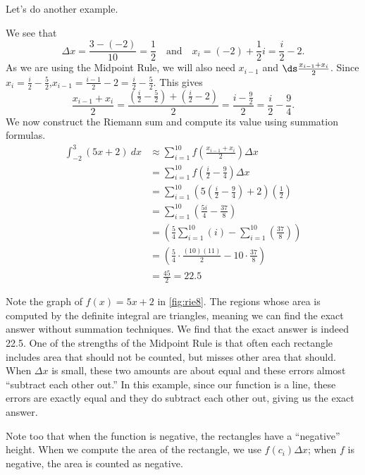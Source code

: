 Let's do another example.

{We see that %
\[
 \Delta x = \frac{3 - (-2)}{10} = \frac12
 \quad \text{and} \quad
 x_i = (-2) + \frac12 i = \frac i2-2.
\]
As we are using the Midpoint Rule, we will also need $x_{i-1}$ and $\ds \frac{x_{i-1}+x_i}2$. Since $x_i = \frac i2-\frac52$,\quad $x_{i-1} = \frac{i-1}2 - 2 = \frac i2 -\frac52$.  This gives 
\[
 \frac{x_{i-1}+x_i}2 = \frac{(\frac i2-\frac52) + (\frac i2-2)}{2} = \frac{i-\frac92}{2} = \frac i2 - \frac94.
\]
We now construct the Riemann sum and compute its value using summation formulas.
\begin{align*}
	\int_{-2}^3 (5x+2)\ dx
	&\approx \sum_{i=1}^{10} f\left(\frac{x_{i-1}+x_i}{2}\right)\Delta x \\
	&= \sum_{i=1}^{10} f\left(\frac i2 - \frac94\right)\Delta x \\
	&= \sum_{i=1}^{10} \left(5\left(\frac i2-\frac94\right) + 2\right)\left(\frac12\right)\\
	&= \sum_{i=1}^{10}\left(\frac{5i}4 - \frac{37}8\right)\\
	&= \left(\frac54\sum_{i=1}^{10} (i) -
	 \sum_{i=1}^{10}\left(\frac{37}8\right)\right) \\
	&= \left(\frac54\cdot\frac{(10)(11)}2 - 10\cdot\frac{37}8\right)  \\
	&= \frac{45}2 = 22.5
\end{align*}


Note the graph of $f(x) = 5x+2$ in \autoref{fig:rie8}. The regions whose area is computed by the definite integral are triangles, meaning we can find the exact answer without summation techniques. We find that the exact answer is indeed 22.5. One of the strengths of the Midpoint Rule is that often each rectangle includes area that should not be counted, but misses other area that should. When $\Delta x$ is small, these two amounts are about equal and these errors almost ``subtract each other out.'' In this example, since our function is a line, these errors are exactly equal and they do subtract each other out, giving us the exact answer.

Note too that when the function is negative, the rectangles have a ``negative'' height. When we compute the area of the rectangle, we use $f(c_i)\Delta x$; when $f$ is negative, the area is counted as negative.}

